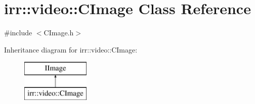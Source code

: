 \hypertarget{classirr_1_1video_1_1_c_image}{\section{irr\-:\-:video\-:\-:C\-Image Class Reference}
\label{classirr_1_1video_1_1_c_image}
}


{\ttfamily \#include $<$C\-Image.\-h$>$}

Inheritance diagram for irr\-:\-:video\-:\-:C\-Image\-:\begin{figure}[H]
\begin{center}
\leavevmode
\includegraphics[height=2.000000cm]{classirr_1_1video_1_1_c_image}
\end{center}
\end{figure}
